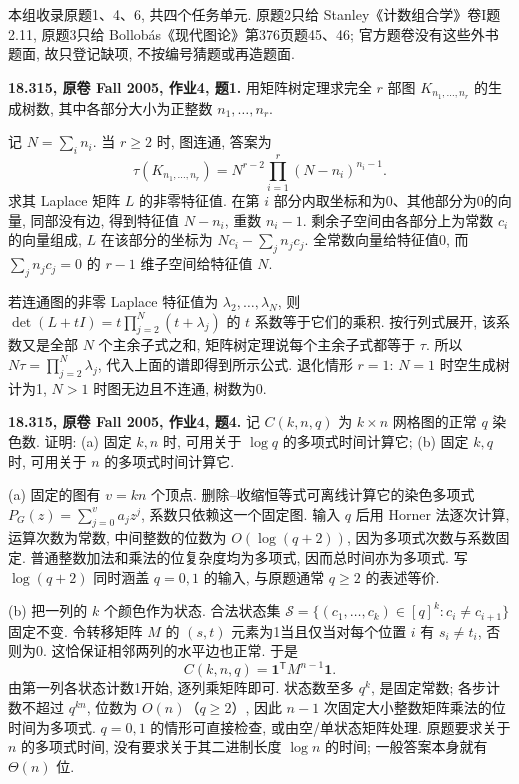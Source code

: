 本组收录原题1、4、6, 共四个任务单元.
原题2只给 Stanley《计数组合学》卷I题2.11,
原题3只给 Bollobás《现代图论》第376页题45、46;
官方题卷没有这些外书题面, 故只登记缺项, 不按编号猜题或再造题面.

\begin{exercise}\label{mit:18315-hw4-q1}
\textbf{18.315, 原卷 Fall 2005, 作业4, 题1.}
用矩阵树定理求完全 $r$ 部图 $K_{n_1,\ldots,n_r}$ 的生成树数,
其中各部分大小为正整数 $n_1,\ldots,n_r$.
\end{exercise}
\begin{solution}
记 $N=\sum_i n_i$. 当 $r\ge2$ 时, 图连通, 答案为
\[
\tau(K_{n_1,\ldots,n_r})=N^{r-2}\prod_{i=1}^r(N-n_i)^{n_i-1}.
\]
求其 Laplace 矩阵 $L$ 的非零特征值.
在第 $i$ 部分内取坐标和为0、其他部分为0的向量,
同部没有边, 得到特征值 $N-n_i$, 重数 $n_i-1$.
剩余子空间由各部分上为常数 $c_i$ 的向量组成,
$L$ 在该部分的坐标为 $Nc_i-\sum_jn_jc_j$.
全常数向量给特征值0, 而 $\sum_jn_jc_j=0$ 的 $r-1$ 维子空间给特征值 $N$.

若连通图的非零 Laplace 特征值为 $\lambda_2,\ldots,\lambda_N$,
则 $\det(L+tI)=t\prod_{j=2}^N(t+\lambda_j)$ 的 $t$ 系数等于它们的乘积.
按行列式展开, 该系数又是全部 $N$ 个主余子式之和,
矩阵树定理说每个主余子式都等于 $\tau$.
所以 $N\tau=\prod_{j=2}^N\lambda_j$, 代入上面的谱即得到所示公式.
退化情形 $r=1$: $N=1$ 时空生成树计为1, $N>1$ 时图无边且不连通, 树数为0.
\end{solution}

\begin{exercise}\label{mit:18315-hw4-q4}
\textbf{18.315, 原卷 Fall 2005, 作业4, 题4.}
记 $C(k,n,q)$ 为 $k\times n$ 网格图的正常 $q$ 染色数.
证明: (a) 固定 $k,n$ 时, 可用关于 $\log q$ 的多项式时间计算它;
(b) 固定 $k,q$ 时, 可用关于 $n$ 的多项式时间计算它.
\end{exercise}
\begin{solution}
(a) 固定的图有 $v=kn$ 个顶点. 删除--收缩恒等式可离线计算它的染色多项式
$P_G(z)=\sum_{j=0}^v a_jz^j$, 系数只依赖这一个固定图.
输入 $q$ 后用 Horner 法逐次计算, 运算次数为常数,
中间整数的位数为 $O(\log(q+2))$, 因为多项式次数与系数固定.
普通整数加法和乘法的位复杂度均为多项式, 因而总时间亦为多项式.
写 $\log(q+2)$ 同时涵盖 $q=0,1$ 的输入, 与原题通常 $q\ge2$ 的表述等价.

(b) 把一列的 $k$ 个颜色作为状态. 合法状态集
$\mathcal S=\{(c_1,\ldots,c_k)\in[q]^k:c_i\ne c_{i+1}\}$ 固定不变.
令转移矩阵 $M$ 的 $(s,t)$ 元素为1当且仅当对每个位置 $i$ 有 $s_i\ne t_i$,
否则为0. 这恰保证相邻两列的水平边也正常.
于是
\[
C(k,n,q)=\boldsymbol1^{\mathsf T}M^{n-1}\boldsymbol1.
\]
由第一列各状态计数1开始, 逐列乘矩阵即可.
状态数至多 $q^k$, 是固定常数; 各步计数不超过 $q^{kn}$,
位数为 $O(n)$（$q\ge2$）, 因此 $n-1$ 次固定大小整数矩阵乘法的位时间为多项式.
$q=0,1$ 的情形可直接检查, 或由空/单状态矩阵处理.
原题要求关于 $n$ 的多项式时间, 没有要求关于其二进制长度 $\log n$ 的时间;
一般答案本身就有 $\Theta(n)$ 位.
\end{solution}

